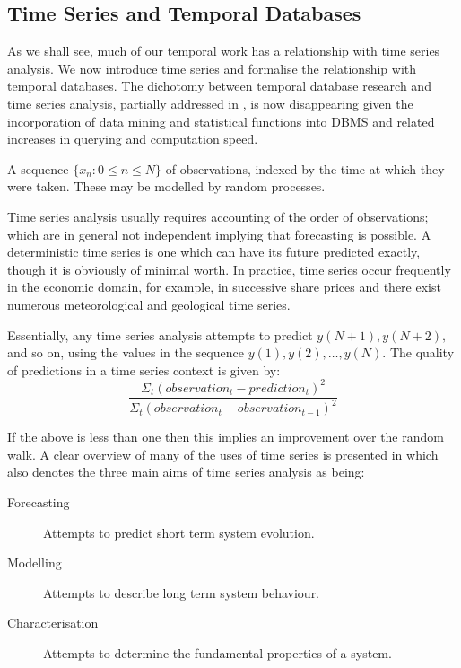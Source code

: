 \subsection{Time Series and Temporal Databases}

As we shall see, much of our temporal work has a relationship with
time series analysis. We now introduce time series and formalise the
relationship with temporal databases. The dichotomy between temporal
database research and time series analysis, partially addressed in
\cite{smd95}, is now disappearing given the incorporation of data
mining and statistical functions into DBMS and related increases in
querying and computation speed.



\begin{definition}
\begin{rm}
A sequence $\{ x_n : 0 \le n \le N \}$ of observations, indexed by the time at which they
were taken. These may be modelled by random processes.
\end{rm}
\end{definition}


Time series analysis usually requires accounting of the order of observations; which
are in general not independent implying that forecasting is possible.  A
deterministic time series is one which can have its future predicted exactly, though it
is obviously of minimal worth.  In practice, time series occur frequently in the 
economic domain, for example, in successive share prices and there exist numerous
meteorological and geological time series. 

Essentially, any time series analysis attempts to predict $y(N + 1), y(N + 2),$ and 
so on, using the values in the sequence $y(1), y(2), \ldots, y(N)$.   
The quality of predictions in a time series context is given by:
\begin{displaymath}
\frac{\Sigma_t (observation_t - prediction_t)^2}
{\Sigma_t (observation_t - observation_{t-1})^2}
\end{displaymath}

If the above is less than one then this implies an improvement over
the random walk.  A clear overview of many of the uses of time series
is presented in \cite{wg94} which
also denotes the three main aims of time series analysis as being:
\begin{description}
\item[Forecasting] Attempts to predict short term system evolution.
\item[Modelling] Attempts to describe long term system behaviour.
\item[Characterisation] Attempts  to determine the fundamental properties
of a system.
\end{description}

